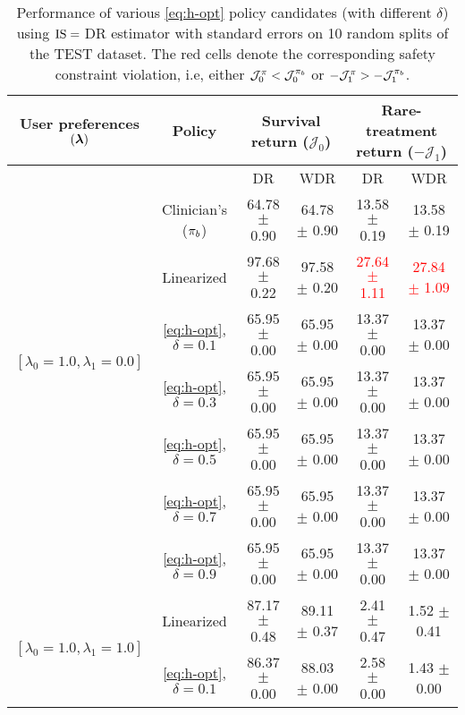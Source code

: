 \begin{table}[h]
    \centering
    \caption{
    Performance of various \ref{eq:h-opt} policy candidates (with different $\delta$) using $\text{IS}=$ DR estimator with standard errors on 10 random splits of the TEST dataset. 
    The red cells denote the corresponding safety constraint violation, i.e, either $\mathcal{J}_{0}^{\pi} < \mathcal{J}_{0}^{\pi_{b}}$ or $-\mathcal{J}_{1}^{\pi} > -\mathcal{J}_{1}^{\pi_{b}}$.}
    \label{table:app-hopt-DR-Adv}
    \vskip 0.1in
    \begin{adjustbox}{max width=1\textwidth,center}
    \begin{tabular}{cccccc}
    \toprule
    \multicolumn{1}{c}{User preferences $(\bm{\lambda})$} & \multicolumn{1}{c}{Policy} & \multicolumn{2}{c}{Survival return ($\mathcal{J}_0$)} & \multicolumn{2}{c}{Rare-treatment return ($- \mathcal{J}_1$)} \\
    \hline
    & & DR & WDR & DR & WDR  \\  \cline{3-6}
    & Clinician's ($\pi_{b}$) & 64.78 $\pm$ 0.90 & 64.78 $\pm$ 0.90          & 13.58 $\pm$ 0.19 & 13.58 $\pm$ 0.19  \\
    \midrule
    \multirow{4}{*}{$[\lambda_0=1.0, \lambda_1 = 0.0]$} 
    & Linearized & 97.68 $\pm$ 0.22 & 97.58 $\pm$ 0.20   & \textcolor{red}{27.64 $\pm$ 1.11 }& \textcolor{red}{27.84 $\pm$ 1.09 } \\ 
    & \ref{eq:h-opt}, $\delta=0.1$  & 65.95 $\pm$ 0.00 & 65.95 $\pm$ 0.00   & 13.37 $\pm$ 0.00 & 13.37 $\pm$ 0.00\\
    & \ref{eq:h-opt},  $\delta=0.3$  & 65.95 $\pm$ 0.00 & 65.95 $\pm$ 0.00   & 13.37 $\pm$ 0.00 & 13.37 $\pm$ 0.00\\
    & \ref{eq:h-opt}, $\delta=0.5$  & 65.95 $\pm$ 0.00 & 65.95 $\pm$ 0.00   & 13.37 $\pm$ 0.00 & 13.37 $\pm$ 0.00\\
    & \ref{eq:h-opt}, $\delta=0.7$  & 65.95 $\pm$ 0.00 & 65.95 $\pm$ 0.00   & 13.37 $\pm$ 0.00 & 13.37 $\pm$ 0.00\\
    & \ref{eq:h-opt}, $\delta=0.9$  & 65.95 $\pm$ 0.00 & 65.95 $\pm$ 0.00   & 13.37 $\pm$ 0.00 & 13.37 $\pm$ 0.00\\
    \midrule
    \multirow{4}{*}{$[\lambda_0=1.0, \lambda_1 = 1.0]$}
    & Linearized & 87.17 $\pm$ 0.48 & 89.11 $\pm$ 0.37   & 2.41 $\pm$ 0.47 & 1.52 $\pm$ 0.41\\
    & \ref{eq:h-opt}, $\delta=0.1$  & 86.37 $\pm$ 0.00 & 88.03 $\pm$ 0.00   & 2.58 $\pm$ 0.00 & 1.43 $\pm$ 0.00\\

\end{tabular}
\end{adjustbox}
\end{table}

